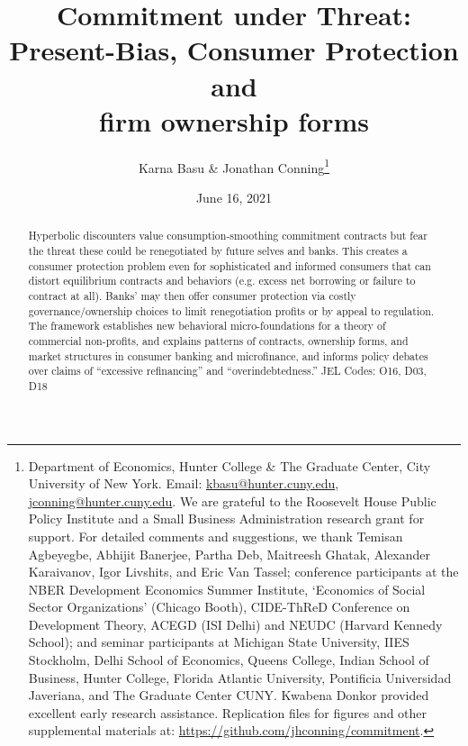 \documentclass[11pt,english]{article}
\date{June 16, 2021}\usepackage{babel}
\theoremstyle{plain}
\theoremstyle{definition}
\begin{document}
\title{Commitment under Threat:\\
Present-Bias,  Consumer Protection and \\ firm ownership forms\\
}

\author{Karna Basu \& Jonathan Conning\thanks{Department of Economics, Hunter College \& The Graduate Center, City
University of New York. Email: \href{mailto:kbasu@hunter.cuny.edu}{kbasu@hunter.cuny.edu}, \href{mailto:jconning@hunter.cuny.edu}{jconning@hunter.cuny.edu}.
We are grateful to the Roosevelt House Public Policy Institute and
a Small Business Administration research grant for support. For detailed
comments and suggestions, we thank Temisan Agbeyegbe, Abhijit Banerjee,
Partha Deb, Maitreesh Ghatak, Alexander Karaivanov, Igor Livshits,
and Eric Van Tassel; conference participants at the NBER Development
Economics Summer Institute, `Economics of Social Sector Organizations'
(Chicago Booth), CIDE-ThReD Conference on Development Theory, ACEGD
(ISI Delhi) and NEUDC (Harvard Kennedy School); and seminar participants
at Michigan State University, IIES Stockholm, Delhi School of Economics,
Queens College, Indian School of Business, Hunter College, Florida
Atlantic University, Pontificia Universidad Javeriana, and The Graduate
Center CUNY. Kwabena Donkor provided excellent early research assistance.
Replication files for figures and other supplemental materials at:
\protect\url{https://github.com/jhconning/commitment}.}}


\begin{abstract}
Hyperbolic discounters value consumption-smoothing commitment contracts
but fear the threat these could be renegotiated by future selves and banks. This creates a consumer protection problem even for sophisticated and informed
consumers that can distort equilibrium contracts and behaviors (e.g.
excess net borrowing or failure to contract at all). Banks' may then offer
consumer protection via costly governance/ownership
choices to limit renegotiation profits or by appeal to regulation. The framework establishes
new behavioral micro-foundations for a theory of commercial non-profits, and explains
 patterns of contracts,  ownership forms, and market structures in consumer
banking and microfinance, and informs policy debates over claims of ``{}excessive
refinancing'' and ``overindebtedness.''{}  JEL Codes: O16, D03,
D18 
\end{abstract}

\maketitle
\end{document}
